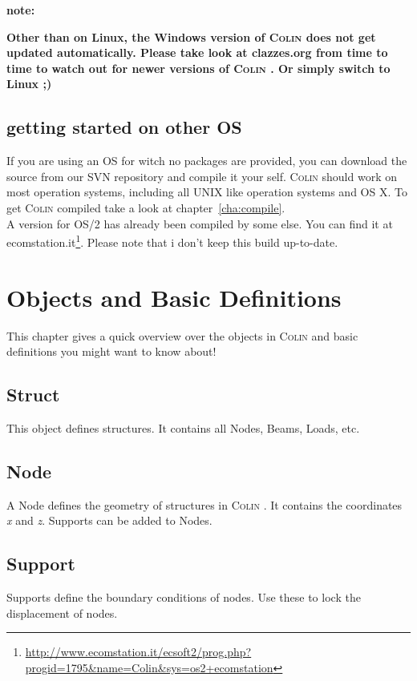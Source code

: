 \documentclass[a4paper,11pt]{report}
\newcommand{\Colin}[0]{\textsc{Colin }}
\begin{document}
\textbf{note:}
\begin{center}
\textbf{Other than on Linux, the Windows version of \Colin does not get updated automatically. Please take look at clazzes.org from time to time to watch out for newer versions of \Colin. Or simply switch to Linux ;)}
\end{center}

\section{getting started on other OS}
\label{sec:startOther}

If you are using an OS for witch no packages are provided, you can download the source from our SVN repository and compile it your self. \Colin should work on most operation systems, including all UNIX like operation systems and OS X. To get \Colin compiled take a look at chapter~\ref{cha:compile}.\\
A version for OS/2 has already been compiled by some else. You can find it at ecomstation.it\footnote{\url{http://www.ecomstation.it/ecsoft2/prog.php?progid=1795&name=Colin&sys=os2+ecomstation}}. Please note that i don't keep this build up-to-date.


\chapter{Objects and Basic Definitions}
\label{cha:objects}

This chapter gives a quick overview over the objects in \Colin and basic definitions you might want to know about!




\section{Struct}
This object defines structures. It contains all Nodes, Beams, Loads, etc. 

\section{Node}
A Node defines the geometry of structures in \Colin. It contains the coordinates \textit{x} and \textit{z}. Supports can be added to Nodes.

\section{Support}
Supports define the boundary conditions of nodes. Use these to lock the displacement of nodes.
\end{document}
